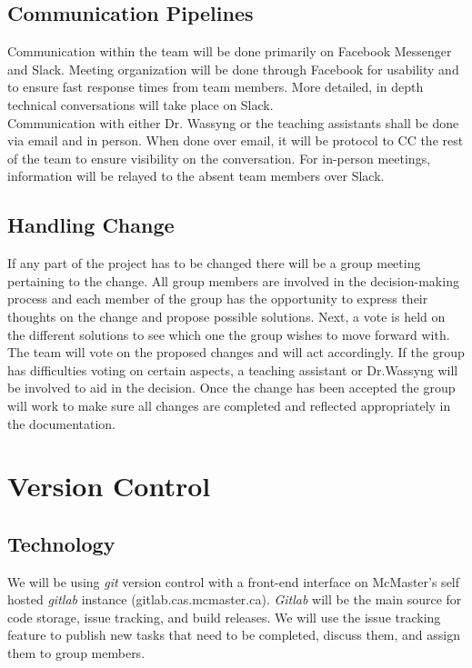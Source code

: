 \documentclass[11pt]{article}
\begin{document}
\subsection{Communication Pipelines}
Communication within the team will be done primarily on Facebook Messenger and Slack. Meeting organization will be done through Facebook for usability and to ensure fast response times from team members. More detailed, in depth technical conversations will take place on Slack.\\

Communication with either Dr. Wassyng or the teaching assistants shall be done via email and in person. When done over email, it will be protocol to CC the rest of the team to ensure visibility on the conversation. For in-person meetings, information will be relayed to the absent team members over Slack.
\subsection{Handling Change}
If any part of the project has to be changed there will be a group meeting pertaining to the change. All group members are involved in the decision-making process and each member of the group has the opportunity to express their thoughts on the change and propose possible solutions. Next, a vote is held on the different solutions to see which one the group wishes to move forward with. The team will vote on the proposed changes and will act accordingly. If the group has difficulties voting on certain aspects, a teaching assistant or Dr.Wassyng will be involved to aid in the decision. Once the change has been accepted the group will work to make sure all changes are completed and reflected appropriately in the documentation.

\section{Version Control}

\subsection{Technology}
We will be using \textit{git} version control with a front-end interface on McMaster's self hosted
\textit{gitlab} instance (gitlab.cas.mcmaster.ca). \textit{Gitlab} will be the main source for
code storage, issue tracking, and build releases. We will use the issue tracking feature to
publish new tasks that need to be completed, discuss them, and assign them to group members.
\end{document}
